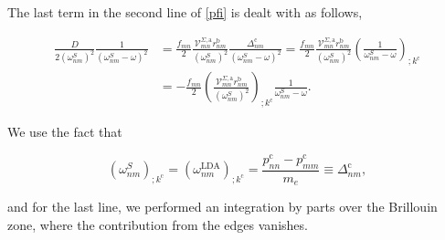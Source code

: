 \documentclass[11pt]{article}
\begin{document}
The last term in the second line of \eqref{pfi} is dealt with as follows,

\begin{align}\label{dresn}
\frac{D}{2(\omega^S_{nm})^2}\frac{1}{(\omega^S_{nm}-\omega)^2} 
&= \frac{f_{mn}}{2}\frac{\mathcal{V}^{\Sigma,\text{a}}_{mn}r^{\text{b}}_{nm}}{(\omega^S_{nm})^2}\frac{\Delta^{\text{c}}_{nm}}{(\omega^S_{nm}-\omega)^2} = \frac{f_{mn}}{2}\frac{\mathcal{V}^{\Sigma,\text{a}}_{mn}r^{\text{b}}_{nm}}{(\omega^S_{nm})^2}\left(\frac{1}{\omega^S_{nm}-\omega}\right)_{;k^{\text{c}}}\nonumber\\
&= -\frac{f_{mn}}{2}\left(\frac{\mathcal{V}^{\Sigma,\text{a}}_{mn}r^{\text{b}}_{nm}}{(\omega^S_{nm})^2}\right)_{;k^{\text{c}}}\frac{1}{\omega^S_{nm}-\omega}.
\end{align} 

We use the fact that

\begin{equation}\label{wk}
(\omega^S_{nm})_{;k^{\text{c}}}=(\omega^\text{LDA}_{nm})_{;k^{\text{c}}} = \frac{p_{nn}^{\text{c}}-p_{mm}^{\text{c}}}{m_{e}} \equiv \Delta_{nm}^{\text{c}},
\end{equation}

and for the last line, we performed an integration by parts over the Brillouin zone, where the contribution from the edges vanishes.
\end{document}
